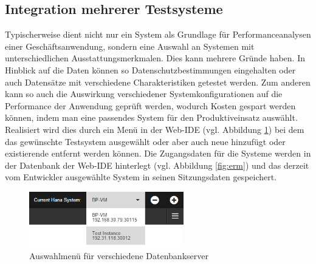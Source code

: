 \subsection{Integration mehrerer Testsysteme}
Typischerweise dient nicht nur ein System als Grundlage für Performanceanalysen einer Geschäftsanwendung, sondern eine Auswahl an Systemen mit unterschiedlichen Ausstattungsmerkmalen.
Dies kann mehrere Gründe haben.
In Hinblick auf die Daten können so Datenschutzbestimmungen eingehalten oder auch Datensätze mit verschiedene Charakteristiken getestet werden.
Zum anderen kann so auch die Auswirkung verschiedener Systemkonfigurationen auf die Performance der Anwendung geprüft werden, wodurch Kosten gespart werden können, indem man eine passendes System für den Produktiveinsatz auswählt.
Realisiert wird dies durch ein Menü in der Web-IDE (vgl. Abbildung \ref{fig:hanainstances}) bei dem das gewünschte Testsystem ausgewählt oder aber auch neue hinzufügt oder existierende entfernt werden können.
Die Zugangsdaten für die Systeme werden in der Datenbank der Web-IDE hinterlegt (vgl. Abbildung \ref{fig:erm}) und das derzeit vom Entwickler ausgewählte System in seinen Sitzungsdaten gespeichert.
\begin{figure}[ht]
	\centering
  \includegraphics[width=0.6\textwidth]{figures/hana-instances.png}
	\caption{Auswahlmenü für verschiedene Datenbankserver}
	\label{fig:hanainstances}
\end{figure}

